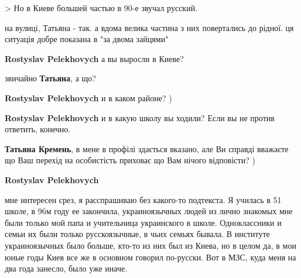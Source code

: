 \begin{itemize}
\begin{itemize}
> Но в Киеве большей частью в 90-е звучал русский.

на вулиці, Татьяна - так. а вдома велика частина з них повертались до рідної.
ця ситуація добре показана в "за двома зайцями"

 
\textbf{Rostyslav Pelekhovych} а вы выросли в Киеве?

 
звичайно \textbf{Татьяна}, а що?

 
\textbf{Rostyslav Pelekhovych} и в каком районе? )

 
\textbf{Rostyslav Pelekhovych} и в какую школу вы ходили? Если вы не против ответить, конечно.

 
\textbf{Татьяна Кремень}, в мене в профілі здається вказано, але Ви справді вважаєте що Ваш перехід на особистість приховає що Вам нічого відповісти? )

 
\textbf{Rostyslav Pelekhovych} 

мне интересен срез, я расспрашиваю без какого-то подтекста. Я училась в 51
школе, в 96м году ее закончила, украиноязычных людей из лично знакомых мне были
только мой папа и учительница украинского в школе. Одноклассники и семьи их
были только русскоязычные, в чьих семьях бывала. В институте украиноязычных
было больше, кто-то из них был из Киева, но в целом да, в мои юные годы Киев
все же в основном говорил по-русски. Вот в МЗС, куда меня на два года занесло,
было уже иначе.



\end{itemize}
\end{itemize}
